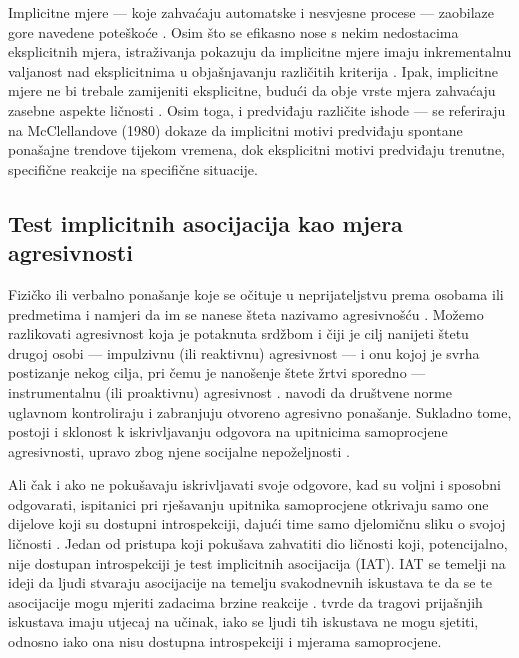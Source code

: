 \documentclass[a4paper, 12pt]{report}
\begin{document}
Implicitne mjere --- koje zahvaćaju automatske i nesvjesne procese --- zaobilaze
gore navedene poteškoće \citep{uhlmann2012getting, wileyhandzgal}. Osim što se
efikasno nose s nekim nedostacima eksplicitnih mjera, istraživanja pokazuju da
implicitne mjere imaju inkrementalnu valjanost nad eksplicitnima u objašnjavanju
različitih kriterija \citep{greenwald2009meta, banse2015predicting,
    galic2016conditional, galic2014validity}.
Ipak, implicitne  mjere ne bi trebale zamijeniti eksplicitne, budući da obje
vrste mjera zahvaćaju zasebne aspekte ličnosti \citep{bing2007integrating}. Osim
toga, i predviđaju različite ishode --- \citet{mcclelland1989self} se
referiraju na McClellandove (1980) dokaze da implicitni motivi predviđaju
spontane ponašajne trendove tijekom vremena, dok eksplicitni motivi predviđaju
trenutne, specifične reakcije na specifične situacije.

\subsection{Test implicitnih asocijacija kao mjera agresivnosti}Fizičko ili verbalno ponašanje koje se
očituje u neprijateljstvu
prema osobama ili predmetima i namjeri da im se nanese šteta nazivamo
agresivnošću \citep{rjecnik}.
Možemo razlikovati agresivnost koja je potaknuta srdžbom i čiji je cilj nanijeti
štetu drugoj osobi --- impulzivnu (ili reaktivnu) agresivnost --- i onu kojoj je svrha
postizanje nekog cilja, pri čemu je nanošenje štete žrtvi sporedno ---
instrumentalnu (ili proaktivnu) agresivnost \citep{rjecnik,brugman2014identifying}.
\citet{reeve} navodi da društvene norme uglavnom kontroliraju i zabranjuju
otvoreno agresivno ponašanje. Sukladno tome, postoji i 
sklonost k iskrivljavanju odgovora na upitnicima samoprocjene agresivnosti,
upravo zbog njene socijalne nepoželjnosti \citep{banse2015predicting}.

Ali čak i ako ne pokušavaju iskrivljavati svoje odgovore, kad su voljni i
sposobni odgovarati, ispitanici pri rješavanju upitnika samoprocjene 
otkrivaju samo one dijelove koji su dostupni introspekciji, dajući time samo
djelomičnu sliku o svojoj ličnosti \citep{wileyhandzgal}.
Jedan od pristupa koji pokušava zahvatiti
dio ličnosti koji, potencijalno, nije dostupan introspekciji je test implicitnih
asocijacija (IAT).  IAT se temelji na ideji da ljudi stvaraju asocijacije na
temelju svakodnevnih iskustava te da se te asocijacije mogu mjeriti zadacima
brzine reakcije \citep{wileyhandzgal}. \citet{greenwald1995implicit} tvrde da
tragovi prijašnjih iskustava imaju utjecaj na učinak, iako se ljudi tih
iskustava ne mogu sjetiti, odnosno iako ona nisu dostupna introspekciji i mjerama
samoprocjene.  
  
\end{document}

